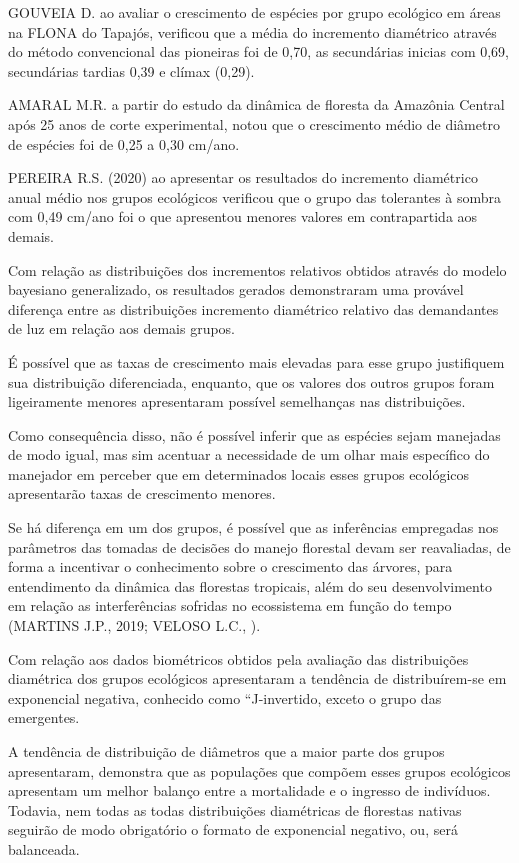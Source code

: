 \documentclass[
]{article}
\begin{document}
GOUVEIA D. ao avaliar o crescimento de espécies por grupo ecológico em
áreas na FLONA do Tapajós, verificou que a média do incremento
diamétrico através do método convencional das pioneiras foi de 0,70, as
secundárias inicias com 0,69, secundárias tardias 0,39 e clímax (0,29).

AMARAL M.R. a partir do estudo da dinâmica de floresta da Amazônia
Central após 25 anos de corte experimental, notou que o crescimento
médio de diâmetro de espécies foi de 0,25 a 0,30 cm/ano.

PEREIRA R.S. (2020) ao apresentar os resultados do incremento diamétrico
anual médio nos grupos ecológicos verificou que o grupo das tolerantes à
sombra com 0,49 cm/ano foi o que apresentou menores valores em
contrapartida aos demais.

Com relação as distribuições dos incrementos relativos obtidos através
do modelo bayesiano generalizado, os resultados gerados demonstraram uma
provável diferença entre as distribuições incremento diamétrico relativo
das demandantes de luz em relação aos demais grupos.

É possível que as taxas de crescimento mais elevadas para esse grupo
justifiquem sua distribuição diferenciada, enquanto, que os valores dos
outros grupos foram ligeiramente menores apresentaram possível
semelhanças nas distribuições.

Como consequência disso, não é possível inferir que as espécies sejam
manejadas de modo igual, mas sim acentuar a necessidade de um olhar mais
específico do manejador em perceber que em determinados locais esses
grupos ecológicos apresentarão taxas de crescimento menores.

Se há diferença em um dos grupos, é possível que as inferências
empregadas nos parâmetros das tomadas de decisões do manejo florestal
devam ser reavaliadas, de forma a incentivar o conhecimento sobre o
crescimento das árvores, para entendimento da dinâmica das florestas
tropicais, além do seu desenvolvimento em relação as interferências
sofridas no ecossistema em função do tempo (MARTINS J.P., 2019; VELOSO
L.C., ).

Com relação aos dados biométricos obtidos pela avaliação das
distribuições diamétrica dos grupos ecológicos apresentaram a tendência
de distribuírem-se em exponencial negativa, conhecido como
``J-invertido, exceto o grupo das emergentes.

A tendência de distribuição de diâmetros que a maior parte dos grupos
apresentaram, demonstra que as populações que compõem esses grupos
ecológicos apresentam um melhor balanço entre a mortalidade e o ingresso
de indivíduos. Todavia, nem todas as todas distribuições diamétricas de
florestas nativas seguirão de modo obrigatório o formato de exponencial
negativo, ou, será balanceada.
\end{document}
